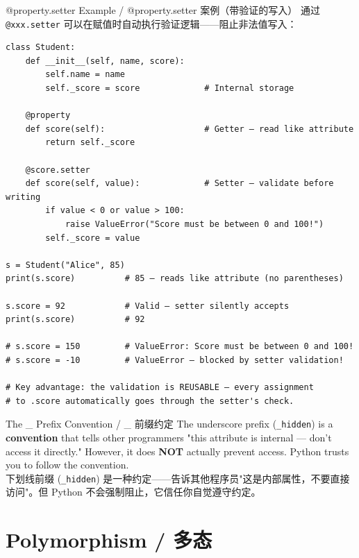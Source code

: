 \documentclass[11pt,a4paper]{report}
\let\oldtexttt\texttt
\renewcommand{\texttt}[1]{\textcolor{mainblue}{\oldtexttt{#1}}}
\begin{document}
\begin{examplebox}{@property.setter Example / @property.setter 案例（带验证的写入）}
    通过 \texttt{@xxx.setter} 可以在赋值时自动执行验证逻辑——阻止非法值写入：
\begin{lstlisting}
class Student:
    def __init__(self, name, score):
        self.name = name
        self._score = score             # Internal storage

    @property
    def score(self):                    # Getter — read like attribute
        return self._score

    @score.setter
    def score(self, value):             # Setter — validate before writing
        if value < 0 or value > 100:
            raise ValueError("Score must be between 0 and 100!")
        self._score = value

s = Student("Alice", 85)
print(s.score)          # 85 — reads like attribute (no parentheses)

s.score = 92            # Valid — setter silently accepts
print(s.score)          # 92

# s.score = 150         # ValueError: Score must be between 0 and 100!
# s.score = -10         # ValueError — blocked by setter validation!

# Key advantage: the validation is REUSABLE — every assignment
# to .score automatically goes through the setter's check.
\end{lstlisting}
\end{examplebox}

\begin{warning}{The \_ Prefix Convention / \_ 前缀约定}
    The underscore prefix (\texttt{\_hidden}) is a \textbf{convention} that tells other programmers "this attribute is internal — don't access it directly." However, it does \textbf{NOT} actually prevent access. Python trusts you to follow the convention. \\
    下划线前缀 (\texttt{\_hidden}) 是一种约定——告诉其他程序员"这是内部属性，不要直接访问"。但 Python 不会强制阻止，它信任你自觉遵守约定。
\end{warning}

\section{Polymorphism / 多态}
\end{document}
